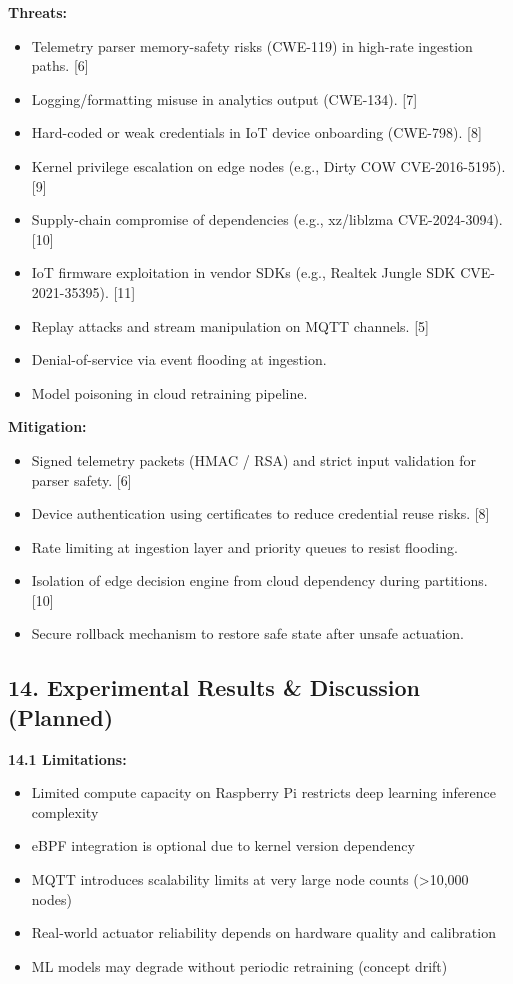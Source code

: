 \documentclass[11pt]{article}
\begin{document}
\textbf{Threats:}
\begin{itemize}
    \item Telemetry parser memory-safety risks (CWE-119) in high-rate ingestion paths. [6]
    \item Logging/formatting misuse in analytics output (CWE-134). [7]
    \item Hard-coded or weak credentials in IoT device onboarding (CWE-798). [8]
    \item Kernel privilege escalation on edge nodes (e.g., Dirty COW CVE-2016-5195). [9]
    \item Supply-chain compromise of dependencies (e.g., xz/liblzma CVE-2024-3094). [10]
    \item IoT firmware exploitation in vendor SDKs (e.g., Realtek Jungle SDK CVE-2021-35395). [11]
    \item Replay attacks and stream manipulation on MQTT channels. [5]
    \item Denial-of-service via event flooding at ingestion.
    \item Model poisoning in cloud retraining pipeline.
\end{itemize}

\textbf{Mitigation:}
\begin{itemize}
    \item Signed telemetry packets (HMAC / RSA) and strict input validation for parser safety. [6]
    \item Device authentication using certificates to reduce credential reuse risks. [8]
    \item Rate limiting at ingestion layer and priority queues to resist flooding.
    \item Isolation of edge decision engine from cloud dependency during partitions. [10]
    \item Secure rollback mechanism to restore safe state after unsafe actuation.
\end{itemize}

\subsection{14. Experimental Results \& Discussion (Planned)}
\textbf{14.1 Limitations:}
\begin{itemize}
    \item Limited compute capacity on Raspberry Pi restricts deep learning inference complexity
    \item eBPF integration is optional due to kernel version dependency
    \item MQTT introduces scalability limits at very large node counts (>10,000 nodes)
    \item Real-world actuator reliability depends on hardware quality and calibration
    \item ML models may degrade without periodic retraining (concept drift)
\end{itemize}
\end{document}
